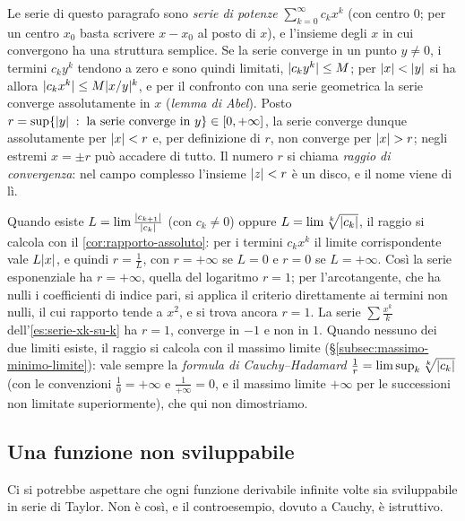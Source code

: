 \begin{osservazione}\label{oss:raggio-convergenza}
Le serie di questo paragrafo sono \emph{serie di potenze} $\sum_{k=0}^{\infty}c_{k}x^{k}$ (con centro $0$;
per un centro $x_{0}$ basta scrivere $x-x_{0}$ al posto di $x$), e l'insieme degli $x$ in cui
convergono ha una struttura semplice. Se la serie converge in un punto $y\neq0$, i
termini $c_{k}y^{k}$ tendono a zero e sono quindi limitati, $\lvert c_{k}y^{k}\rvert\le M$; per $\lvert x\rvert<\lvert y\rvert$
si ha allora $\lvert c_{k}x^{k}\rvert\le M\lvert x/y\rvert^{k}$, e per il confronto con una serie geometrica la
serie converge assolutamente in $x$ (\emph{lemma di Abel}). Posto
$r=\sup\{\lvert y\rvert\;:\;\text{la serie converge in }y\}\in[0,+\infty]$, la serie converge dunque
assolutamente per $\lvert x\rvert<r$ e, per definizione di $r$, non converge per $\lvert x\rvert>r$; negli
estremi $x=\pm r$ può accadere di tutto. Il numero $r$ si chiama \emph{raggio di
convergenza}: nel campo complesso l'insieme $\lvert z\rvert<r$ è un disco, e il nome viene di lì.

Quando esiste $L=\lim\frac{\lvert c_{k+1}\rvert}{\lvert c_{k}\rvert}$ (con $c_{k}\neq0$) oppure $L=\lim\sqrt[k]{\lvert c_{k}\rvert}$, il
raggio si calcola con il \cref{cor:rapporto-assoluto}: per i termini $c_{k}x^{k}$ il limite
corrispondente vale $L\lvert x\rvert$, e quindi $r=\frac1L$, con $r=+\infty$ se $L=0$ e $r=0$ se $L=+\infty$.
Così la serie esponenziale ha $r=+\infty$, quella del logaritmo $r=1$; per l'arcotangente,
che ha nulli i coefficienti di indice pari, si applica il criterio direttamente ai
termini non nulli, il cui rapporto tende a $x^{2}$, e si trova ancora $r=1$. La serie
$\sum\frac{x^{k}}k$ dell'\cref{es:serie-xk-su-k} ha $r=1$, converge in $-1$ e non in $1$.
Quando nessuno dei due limiti esiste, il raggio si calcola con il massimo limite
(\S\ref{subsec:massimo-minimo-limite}): vale sempre la \emph{formula di
Cauchy--Hadamard}
$\frac1r=\limsup_{k}\sqrt[k]{\lvert c_{k}\rvert}$ (con le convenzioni $\frac10=+\infty$ e
$\frac1{+\infty}=0$, e il massimo limite $+\infty$ per le successioni non limitate
superiormente), che qui non dimostriamo.
\end{osservazione}

\subsection{Una funzione non sviluppabile}

Ci si potrebbe aspettare che ogni funzione derivabile infinite volte sia sviluppabile in
serie di Taylor. Non è così, e il controesempio, dovuto a Cauchy, è istruttivo.


